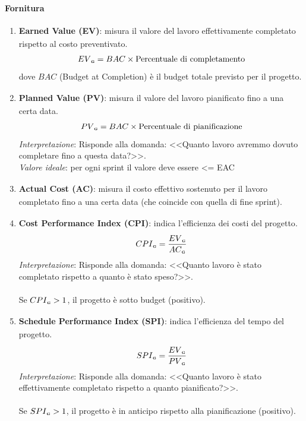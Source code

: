 \documentclass[a4paper,11pt]{article}
\newcommand{\G}{\textsubscript{\scalebox{0.6}{\textbf{G}}}}
\begin{document}
\paragraph{Fornitura}{
    \begin{enumerate}[label=\textbf{MPC0\arabic*}, leftmargin=4.5em, series=metriche_processo] %
        \item \textbf{Earned Value (EV)\G{}}: misura il valore del lavoro effettivamente completato rispetto al costo preventivato.
        \[ EV\G{} = BAC \times \text{Percentuale di completamento} \]
        dove $BAC$ (Budget at Completion) è il budget totale previsto per il progetto\G{}.

        \item \textbf{Planned Value (PV)\G{}}: misura il valore del lavoro pianificato fino a una certa data.
        \[ PV\G{} = BAC \times \text{Percentuale di pianificazione} \]
        \textit{Interpretazione}: Risponde alla domanda: <<Quanto lavoro avremmo dovuto completare fino a questa data?>>.
        \\ \textit{Valore ideale}: per ogni sprint\G{} il valore deve essere <= EAC\G{}

        \item \textbf{Actual Cost (AC)\G{}}: misura il costo effettivo sostenuto per il lavoro completato fino a una certa data (che coincide con quella di fine sprint\G{}).

        \item \textbf{Cost Performance Index (CPI)\G{}}: indica l'efficienza\G{} dei costi del progetto\G{}.
        \[ CPI\G{} = \frac{EV\G{}}{AC\G{}} \]
        \textit{Interpretazione}: Risponde alla domanda: <<Quanto lavoro è stato completato rispetto a quanto è stato speso?>>.\\
        \\Se $CPI\G{} > 1$, il progetto\G{} è sotto budget (positivo).

        \item \textbf{Schedule Performance Index (SPI)\G{}}: indica l'efficienza\G{} del tempo del progetto\G{}.
        \[ SPI\G{} = \frac{EV\G{}}{PV\G{}} \]
        \textit{Interpretazione}: Risponde alla domanda: <<Quanto lavoro è stato effettivamente completato rispetto a quanto pianificato?>>.\\
        \\Se $SPI\G{} > 1$, il progetto\G{} è in anticipo rispetto alla pianificazione (positivo).


\end{enumerate}}
\end{document}
